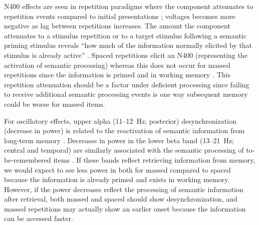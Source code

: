 N400 effects are seen in repetition paradigms where the component attenuates to repetition events compared to initial presentations \cite{KimEtal2001,OlicEtal2000,VanSEtal2007}; voltages becomes more negative as lag between repetitions increases.  The amount the component attenuates to a stimulus repetition or to a target stimulus following a semantic priming stimulus reveals ``how much of the information normally elicited by that stimulus is already active'' \cite[p.~23]{KutaFede2011}.  Spaced repetitions elicit an N400 (representing the activation of semantic processing) whereas this does not occur for massed repetitions since the information is primed and in working memory \cite{VanSEtal2007}.  This repetition attenuation should be a factor under deficient processing since failing to receive additional semantic processing events is one way subsequent memory could be worse for massed items.




For oscillatory effects, upper alpha (11--12~Hz; posterior) desynchronization (decrease in power) is related to the reactivation of semantic information from long-term memory \cite{Klim1999,KlimEtal2005}.  Decreases in power in the lower beta band (13--21~Hz; central and temporal) are similarly associated with the semantic processing of to-be-remembered items \cite{FellEtal2013,HansEtal2012,HansEtal2011a}.  If these bands reflect retrieving information from memory, we would expect to see less power in both for massed compared to spaced because the information is already primed and exists in working memory.  However, if the power decreases reflect the processing of semantic information after retrieval, both massed and spaced should show desynchronization, and massed repetitions may actually show an earlier onset because the information can be accessed faster.


